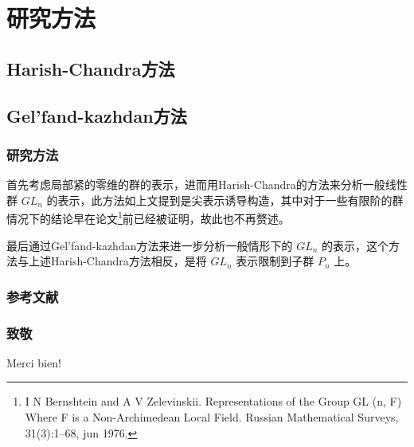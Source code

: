 \documentclass[aspectratio=169]{beamer}
\begin{document}
\section{研究方法}


\subsection{Harish-Chandra方法}

\subsection{Gel'fand-kazhdan方法}



\begin{frame}
  \frametitle{研究方法}
首先考虑局部紧的零维的群的表示，进而用Harish-Chandra的方法来分析一般线性群 $GL_{n}$ 的表示，此方法如上文提到是尖表示诱导构造，其中对于一些有限阶的群情况下的结论早在论文\cite{Bernshtein_1976}\footnote{I N Bernshtein and A V Zelevinskii.
Representations of the Group GL (n, F) Where F is a
Non-Archimedean Local Field.
Russian Mathematical Surveys, 31(3):1–68, jun 1976.}前已经被证明，故此也不再赘述。

\vspace{0.7cm}

最后通过Gel'fand-kazhdan方法来进一步分析一般情形下的 $GL_{n}$ 的表示，这个方法与上述Harish-Chandra方法相反，是将 $GL_{n}$ 表示限制到子群 $P_{n}$ 上。
\end{frame}


\begin{frame}[allowframebreaks]
\frametitle{参考文献}


\end{frame}

\begin{frame}
\frametitle{致敬}
\Huge{\centerline{Merci bien!}}

\end{frame}
\end{document}
